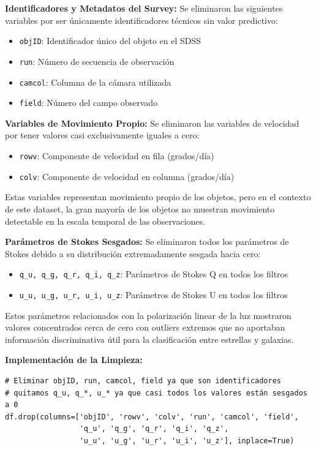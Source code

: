 \documentclass{article}
\begin{document}
\textbf{Identificadores y Metadatos del Survey:}
Se eliminaron las siguientes variables por ser únicamente identificadores técnicos sin valor predictivo:
\begin{itemize}
    \item \texttt{objID}: Identificador único del objeto en el SDSS
    \item \texttt{run}: Número de secuencia de observación
    \item \texttt{camcol}: Columna de la cámara utilizada
    \item \texttt{field}: Número del campo observado
\end{itemize}

\textbf{Variables de Movimiento Propio:}
Se eliminaron las variables de velocidad por tener valores casi exclusivamente iguales a cero:
\begin{itemize}
    \item \texttt{rowv}: Componente de velocidad en fila (grados/día)
    \item \texttt{colv}: Componente de velocidad en columna (grados/día)
\end{itemize}

Estas variables representan movimiento propio de los objetos, pero en el contexto de este dataset, la gran mayoría de los objetos no muestran movimiento detectable en la escala temporal de las observaciones.

\textbf{Parámetros de Stokes Sesgados:}
Se eliminaron todos los parámetros de Stokes debido a su distribución extremadamente sesgada hacia cero:
\begin{itemize}
    \item \texttt{q\_u, q\_g, q\_r, q\_i, q\_z}: Parámetros de Stokes Q en todos los filtros
    \item \texttt{u\_u, u\_g, u\_r, u\_i, u\_z}: Parámetros de Stokes U en todos los filtros
\end{itemize}

Estos parámetros relacionados con la polarización linear de la luz mostraron valores concentrados cerca de cero con outliers extremos que no aportaban información discriminativa útil para la clasificación entre estrellas y galaxias.

\textbf{Implementación de la Limpieza:}

\begin{verbatim}
# Eliminar objID, run, camcol, field ya que son identificadores
# quitamos q_u, q_*, u_* ya que casi todos los valores están sesgados a 0
df.drop(columns=['objID', 'rowv', 'colv', 'run', 'camcol', 'field', 
                 'q_u', 'q_g', 'q_r', 'q_i', 'q_z', 
                 'u_u', 'u_g', 'u_r', 'u_i', 'u_z'], inplace=True)
\end{verbatim}
\end{document}
